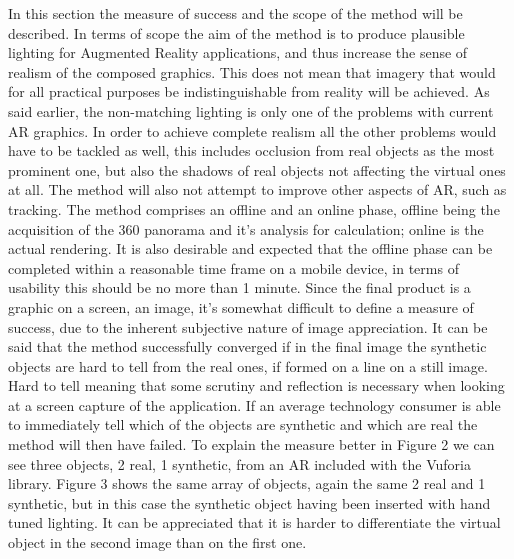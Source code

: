 
In this section the measure of success and the scope of the method will be described. In terms of scope the aim of the method is to produce plausible lighting for Augmented Reality applications, and thus increase the sense of realism of the composed graphics. This does not mean that imagery that would for all practical purposes be indistinguishable from reality will be achieved. As said earlier, the non-matching lighting is only one of the problems with current AR graphics. In order to achieve complete realism all the other problems would have to be tackled as well, this includes occlusion from real objects as the most prominent one, but also the shadows of real objects not affecting the virtual ones at all. The method will also not attempt to improve other aspects of AR, such as tracking. The method comprises an offline and an online phase, offline being the acquisition of the 360 panorama and it's analysis for calculation; online is the actual rendering. It is also desirable and expected that the offline phase can be completed within a reasonable time frame on a mobile device, in terms of usability this should be no more than 1 minute.\newline
Since the final product is a graphic on a screen, an image, it's somewhat difficult to define a measure of success, due to the inherent subjective nature of image appreciation. It can be said that the method successfully converged if in the final image the synthetic objects are hard to tell from the real ones, if formed on a line on a still image. Hard to tell meaning that some scrutiny and reflection is necessary when looking at a screen capture of the application. If an average technology consumer is able to immediately tell which of the objects are synthetic and which are real the method will then have failed. To explain the measure better in Figure 2 we can see three objects, 2 real, 1 synthetic, from an AR included with the Vuforia library. Figure 3 shows the same array of objects, again the same 2 real and 1 synthetic, but in this case the synthetic object having been inserted with hand tuned lighting. It can be appreciated that it is harder to differentiate the virtual object in the second image than on the first one.

